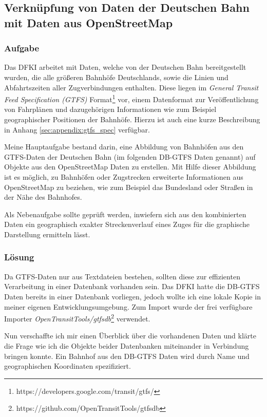 \subsection{Verknüpfung von Daten der Deutschen Bahn mit Daten aus OpenStreetMap}
\subsubsection{Aufgabe}
Das DFKI arbeitet mit Daten, welche von der Deutschen Bahn bereitgestellt wurden, die alle größeren Bahnhöfe Deutschlands, sowie die Linien und Abfahrtszeiten aller Zugverbindungen enthalten.
Diese liegen im \textit{General Transit Feed Specification (GTFS)} Format\footnote{https://developers.google.com/transit/gtfs/} vor, einem Datenformat zur Veröffentlichung von Fahrplänen und dazugehörigen Informationen wie zum Beispiel geographischer Positionen der Bahnhöfe. Hierzu ist auch eine kurze Beschreibung in Anhang \ref{sec:appendix:gtfs_spec} verfügbar.

Meine Hauptaufgabe bestand darin, eine Abbildung von Bahnhöfen aus den GTFS-Daten der Deutschen Bahn (im folgenden DB-GTFS Daten genannt) auf Objekte aus den OpenStreetMap Daten zu erstellen.
Mit Hilfe dieser Abbildung ist es möglich, zu Bahnhöfen oder Zugstrecken erweiterte Informationen aus OpenStreetMap zu beziehen, wie zum Beispiel das Bundesland oder Straßen in der Nähe des Bahnhofes.

Als Nebenaufgabe sollte geprüft werden, inwiefern sich aus den kombinierten Daten ein geographisch exakter Streckenverlauf eines Zuges für die graphische Darstellung ermitteln lässt.

\subsubsection{Lösung}
Da GTFS-Daten nur aus Textdateien bestehen, sollten diese zur effizienten Verarbeitung in einer Datenbank vorhanden sein.
Das DFKI hatte die DB-GTFS Daten bereits in einer Datenbank vorliegen, jedoch wollte ich eine lokale Kopie in meiner eigenen Entwicklungsumgebung.
Zum Import wurde der frei verfügbare Importer \textit{OpenTransitTools/gtfsdb}\footnote{https://github.com/OpenTransitTools/gtfsdb} verwendet.

Nun verschaffte ich mir einen Überblick über die vorhandenen Daten und klärte die Frage wie ich die Objekte beider Datenbanken miteinander in Verbindung bringen konnte.
Ein Bahnhof aus den DB-GTFS Daten wird durch Name und geographischen Koordinaten spezifiziert.

